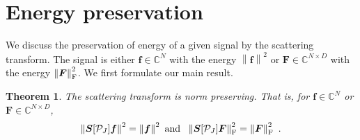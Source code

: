 \documentclass{article}
\newtheorem{theorem}{Theorem}[section]
\def\CC{\mathbb{C}}
\def\cP{\mathcal{P}}
\def\BF{\boldsymbol{F}}
\def\BS{\boldsymbol{S}}
\def\Bf{\boldsymbol{f}}
\newcommand{\F}{\textup{\mbox{F}}}
\newcommand{\norm}[1]{\left\lVert#1\right\rVert}
\begin{document}
\section{Energy preservation}\label{sec:energy}

We discuss the preservation of energy of a given signal by the scattering transform. The signal is either $\Bf \in \CC^N$ with the energy $\norm{\Bf}^2$ or $\BF \in \CC^{N \times D}$ with the energy $\norm{\BF}_{\F}^2$. We first formulate our main result.

\begin{theorem}\label{thm:normPreserving}
The scattering transform is norm preserving. That is, for $\Bf \in \CC^N$ or $\BF \in \CC^{N \times D}$,
\begin{equation}
\label{eq:normPreserving}
\norm{\BS[\cP_J] \Bf}^2 = \norm{\Bf}^2 \mbox{ and } ~ \norm{\BS[\cP_J]\BF}_{\F}^2 = \norm{\BF}_{\F}^2 ~.
\end{equation}
\end{theorem}
\end{document}
